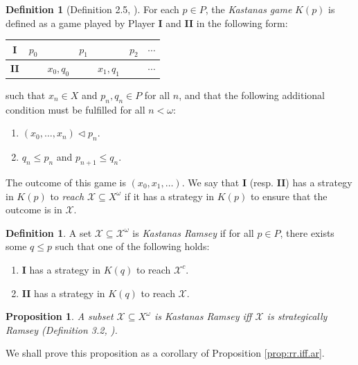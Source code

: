 \documentclass[11pt,reqno]{amsart}
\theoremstyle{plain}
\numberwithin{equation}{section}
\newtheorem{proposition}[theorem]{Proposition}
\theoremstyle{definition}
\newtheorem{definition}[theorem]{Definition}
\newcommand{\cal}{\mathcal}
\newcommand{\X}{\cal{X}}
\begin{document}
\begin{definition}[Definition 2.5, \cite{d20}]
    For each $p \in P$, the \emph{Kastanas game} $K(p)$ is defined as a game played by Player \textbf{I} and \textbf{II} in the following form:
    \begin{center}
        \begin{tabular}{c|cccccc}
            \textbf{I} & $p_0$ & & $p_1$ & & $p_2$ & $\cdots$ \\
            \hline
            \textbf{II} & & $x_0,q_0$ & & $x_1,q_1$ & & $\cdots$ 
        \end{tabular}
    \end{center}
    such that $x_n \in X$ and $p_n,q_n \in P$ for all $n$, and that the following additional condition must be fulfilled for all $n < \omega$:
    \begin{enumerate}
        \item $(x_0,\dots,x_n) \lhd p_n$.

        \item $q_n \leq p_n$ and $p_{n+1} \leq q_n$.
    \end{enumerate}
    The outcome of this game is $(x_0,x_1,\dots)$. We say that \textbf{I} (resp. \textbf{II}) has a strategy in $K(p)$ to \emph{reach} $\X \subseteq X^\omega$ if it has a strategy in $K(p)$ to ensure that the outcome is in $\X$. 
\end{definition}

\begin{definition}
\label{def:kr.gowers}
    A set $\X \subseteq \X^\omega$ is \emph{Kastanas Ramsey} if for all $p \in P$, there exists some $q \leq p$ such that one of the following holds:
    \begin{enumerate}
        \item \textbf{I} has a strategy in $K(q)$ to reach $\X^c$.

        \item \textbf{II} has a strategy in $K(q)$ to reach $\X$.
    \end{enumerate}
\end{definition}

\begin{proposition}
\label{prop:kr.iff.sr}
    A subset $\X \subseteq X^\omega$ is Kastanas Ramsey iff $\X$ is strategically Ramsey (Definition 3.2, \cite{d20}).
\end{proposition}

We shall prove this proposition as a corollary of Proposition \ref{prop:rr.iff.ar}. 
\end{document}
